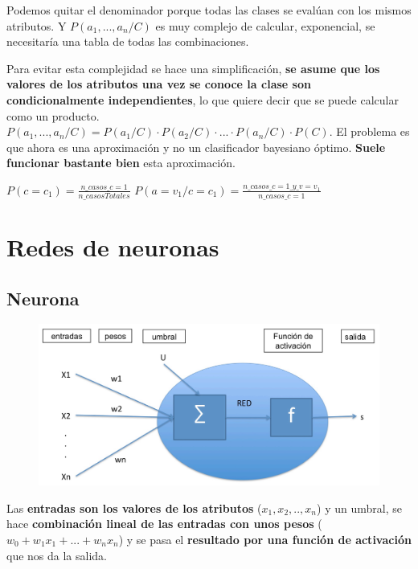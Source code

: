 \documentclass[12pt, twoside, openright]{report} %
\begin{document}
Podemos quitar el denominador porque todas las clases se evalúan con los
mismos atributos. Y \(P(a_1, ...,a_n/C)\) es muy complejo de calcular,
exponencial, se necesitaría una tabla de todas las combinaciones.

Para evitar esta complejidad se hace una simplificación, \textbf{se asume que los valores de los atributos una vez se conoce la clase son
condicionalmente independientes}, lo que quiere decir que se puede
calcular como un producto.
\(P(a_1, ...,a_n/C) = P(a_1/C) \cdot P(a_2/C) \cdot ... \cdot P(a_n/C) \cdot P(C)\).
El problema es que ahora es una aproximación y no un clasificador
bayesiano óptimo. \textbf{Suele funcionar bastante bien} esta
aproximación.

\(P(c=c_1)= \frac {n\_casos\_c=1}{n\_casosTotales}\)
\(P(a=v_1/c=c_1)= \frac {n\_casos\_c=1\_y\_v=v_1}{n\_casos\_c=1}\)

\section{Redes de neuronas}

\subsection{Neurona}

\begin{figure}[H]
	{\includegraphics[scale=.2]{image-20210312101135112.png}}
\end{figure}
Las \textbf{entradas son los valores de los atributos}
(\(x_1,x_2,..,x_n\)) y un umbral, se hace \textbf{combinación lineal de
las entradas con unos pesos} (\(w_0+w_1x_1+...+w_nx_n\)) y se pasa el
\textbf{resultado por una función de activación} que nos da la salida.
\end{document}
